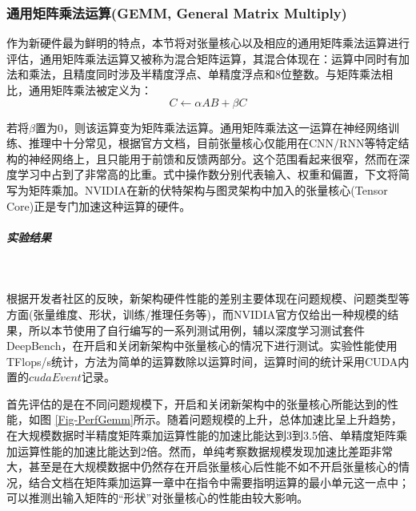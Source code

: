 \subsubsection{通用矩阵乘法运算(GEMM, General Matrix Multiply)}
\par 作为新硬件最为鲜明的特点，本节将对张量核心以及相应的通用矩阵乘法运算进行评估，通用矩阵乘法运算又被称为混合矩阵运算，其混合体现在：运算中同时有加法和乘法，且精度同时涉及半精度浮点、单精度浮点和8位整数。与矩阵乘法相比，通用矩阵乘法被定义为：
$$ C \leftarrow \alpha AB + \beta C $$
\par 若将$ \beta $置为0，则该运算变为矩阵乘法运算。通用矩阵乘法这一运算在神经网络训练、推理中十分常见，根据官方文档，目前张量核心仅能用在CNN/RNN等特定结构的神经网络上，且只能用于前馈和反馈两部分。这个范围看起来很窄，然而在深度学习中占到了非常高的比重。式中操作数分别代表输入、权重和偏置，下文将简写为矩阵乘加。NVIDIA在新的伏特架构与图灵架构中加入的张量核心(Tensor Core)正是专门加速这种运算的硬件。
\subparagraph{实验结果}~{}
\par 根据开发者社区的反映，新架构硬件性能的差别主要体现在问题规模、问题类型等方面(张量维度、形状，训练/推理任务等)，而NVIDIA官方仅给出一种规模的结果，所以本节使用了自行编写的一系列测试用例，辅以深度学习测试套件DeepBench\cite{DEEPBENCH}，在开启和关闭新架构中张量核心的情况下进行测试。实验性能使用TFlops/s统计，方法为简单的运算数除以运算时间，运算时间的统计采用CUDA内置的$ cudaEvent $记录。
\par 首先评估的是在不同问题规模下，开启和关闭新架构中的张量核心所能达到的性能，如图 \ref{Fig-PerfGemm}所示。随着问题规模的上升，总体加速比呈上升趋势，在大规模数据时半精度矩阵乘加运算性能的加速比能达到3到3.5倍、单精度矩阵乘加运算性能的加速比能达到2倍。然而，单纯考察数据规模发现加速比差距非常大，甚至是在大规模数据中仍然存在开启张量核心后性能不如不开启张量核心的情况，结合文档在矩阵乘加运算一章中在指令中需要指明运算的最小单元这一点中\cite{PTX}；可以推测出输入矩阵的“形状”对张量核心的性能由较大影响。
